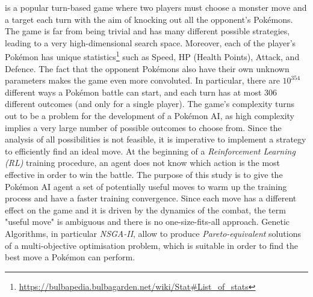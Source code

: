  is a popular turn-based game where two players must choose a monster move and a target each turn with the aim of knocking out all the opponent's Pokémons. The game is far from being trivial and has many different possible strategies, leading to a very high-dimensional search space. Moreover, each of the player's Pokémon has unique statistics\footnote{\url{https://bulbapedia.bulbagarden.net/wiki/Stat\#List_of_stats}} such as Speed, HP (Health Points), Attack, and Defence. The fact that the opponent Pokémons also have their own unknown parameters makes the game even more convoluted. In particular, there are $10^{354}$ different ways a Pokémon battle can start, and each turn has at most $306$ different outcomes (and only for a single player). The game's complexity turns out to be a problem for the development of a Pokémon AI, as high complexity implies a very large number of possible outcomes to choose from. Since the analysis of all possibilities is not feasible, it is imperative to implement a strategy to efficiently find an ideal move. At the beginning of a \emph{Reinforcement Learning (RL)} training procedure, an agent does not know which action is the most effective in order to win the battle. The purpose of this study is to give the Pokémon AI agent a set of potentially useful moves to warm up the training process and have a faster training convergence. Since each move has a different effect on the game and it is driven by the dynamics of the combat, the term "useful move" is ambiguous and there is no one-size-fits-all approach. Genetic Algorithms, in particular \emph{NSGA-II}, allow to produce \emph{Pareto-equivalent} solutions of a multi-objective optimisation problem, which is suitable in order to find the best move a Pokémon can perform.
